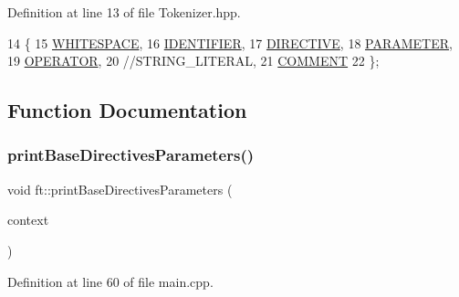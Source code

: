 Definition at line 13 of file Tokenizer.\+hpp.


\begin{DoxyCode}
14     \{
15         \hyperlink{namespaceft_aa520fbf142ba1e7e659590c07da31921aba113c37f25d24aada154b75c7dd91ba}{WHITESPACE},
16         \hyperlink{namespaceft_aa520fbf142ba1e7e659590c07da31921a84f8ae2490f9e4bd2321fd21f4b0e807}{IDENTIFIER},
17         \hyperlink{namespaceft_aa520fbf142ba1e7e659590c07da31921ae3852cb010d5e422026faf83b3c16f0e}{DIRECTIVE},
18         \hyperlink{namespaceft_aa520fbf142ba1e7e659590c07da31921a194cde856bd2d79eac8adb9741c55940}{PARAMETER},
19         \hyperlink{namespaceft_aa520fbf142ba1e7e659590c07da31921a6411d9d6073252e4d316493506bbb979}{OPERATOR},
20         \textcolor{comment}{//STRING\_LITERAL,}
21         \hyperlink{namespaceft_aa520fbf142ba1e7e659590c07da31921aae696377c19e507b64e16be78ce3bbdb}{COMMENT}
22     \};
\end{DoxyCode}


\subsection{Function Documentation}
\mbox{\label{namespaceft_af12105e484dbac115fe1d6a4ff074f27}} 
\subsubsection{\texorpdfstring{print\+Base\+Directives\+Parameters()}{printBaseDirectivesParameters()}}
{\footnotesize\ttfamily void ft\+::print\+Base\+Directives\+Parameters (\begin{DoxyParamCaption}\item[{\hyperlink{classft_1_1_base_directives}{ft\+::\+Base\+Directives} \&}]{context }\end{DoxyParamCaption})}



Definition at line 60 of file main.\+cpp.



